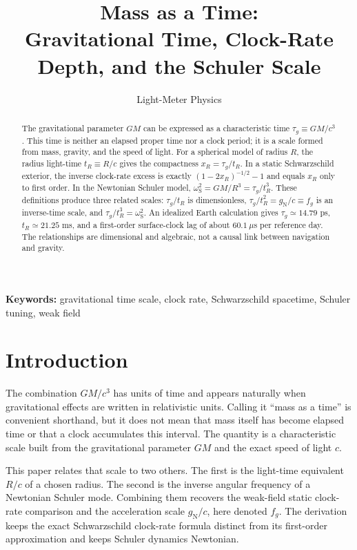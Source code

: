 \documentclass[12pt]{article}
\title{Mass as a Time:\\
Gravitational Time, Clock-Rate Depth, and the Schuler Scale}
\author{Light-Meter Physics}
\date{}
\begin{document}
\maketitle

\begin{abstract}
The gravitational parameter $GM$ can be expressed as a characteristic time $\tau_g\equiv GM/c^3$. This time is neither an elapsed proper time nor a clock period; it is a scale formed from mass, gravity, and the speed of light. For a spherical model of radius $R$, the radius light-time $t_R\equiv R/c$ gives the compactness $x_R=\tau_g/t_R$. In a static Schwarzschild exterior, the inverse clock-rate excess is exactly $(1-2x_R)^{-1/2}-1$ and equals $x_R$ only to first order. In the Newtonian Schuler model, $\omega_{\mathrm{S}}^2=GM/R^3=\tau_g/t_R^3$. These definitions produce three related scales: $\tau_g/t_R$ is dimensionless, $\tau_g/t_R^2=g_{\mathrm{N}}/c\equiv f_g$ is an inverse-time scale, and $\tau_g/t_R^3=\omega_{\mathrm{S}}^2$. An idealized Earth calculation gives $\tau_g\simeq14.79$ ps, $t_R\simeq21.25$ ms, and a first-order surface-clock lag of about $60.1\ \mu$s per reference day. The relationships are dimensional and algebraic, not a causal link between navigation and gravity.
\end{abstract}

\noindent\textbf{Keywords:} gravitational time scale, clock rate, Schwarzschild spacetime, Schuler tuning, weak field

\section{Introduction}

The combination $GM/c^3$ has units of time and appears naturally when gravitational effects are written in relativistic units. Calling it ``mass as a time'' is convenient shorthand, but it does not mean that mass itself has become elapsed time or that a clock accumulates this interval. The quantity is a characteristic scale built from the gravitational parameter $GM$ and the exact speed of light $c$.

This paper relates that scale to two others. The first is the light-time equivalent $R/c$ of a chosen radius. The second is the inverse angular frequency of a Newtonian Schuler mode. Combining them recovers the weak-field static clock-rate comparison and the acceleration scale $g_{\mathrm{N}}/c$, here denoted $f_g$. The derivation keeps the exact Schwarzschild clock-rate formula distinct from its first-order approximation and keeps Schuler dynamics Newtonian.
\end{document}
